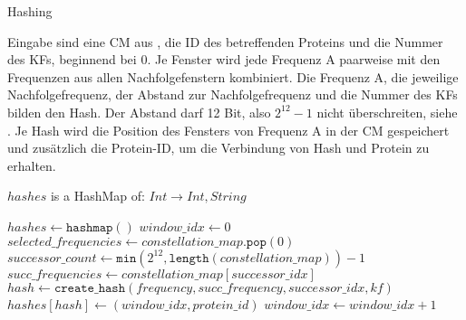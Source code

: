         \begin{algorithm}[H]
            \caption{Hashing}\label{alg:hashing}
            Eingabe sind eine \acl{CM} aus , die ID des betreffenden Proteins und die Nummer des \acl{KF}s, beginnend bei 0. Je Fenster wird jede Frequenz A paarweise mit den Frequenzen aus allen Nachfolgefenstern kombiniert. Die Frequenz A, die jeweilige Nachfolgefrequenz, der Abstand zur Nachfolgefrequenz und die Nummer des \acl{KF}s bilden den Hash. Der Abstand darf 12 Bit, also $2^{12}-1$ nicht überschreiten, siehe . Je Hash wird die Position des Fensters von Frequenz A in der \acl{CM} gespeichert und zusätzlich die Protein-ID, um die Verbindung von Hash und Protein zu erhalten.
            \begin{algorithmic}[1]
                \Ensure $hashes$ is a HashMap of: $Int \rightarrow Int, String$

                \State $hashes \gets \texttt{hashmap}()$
                \State $window\_idx \gets 0$
                \Repeat
                    \State $selected\_frequencies \gets constellation\_map.\texttt{pop}(0)$
                        \State $successor\_count \gets \texttt{min}(2^{12}, \texttt{length}(constellation\_map)) - 1$
                            \State $succ\_frequencies \gets constellation\_map[successor\_idx]$
                                \State $hash \gets \texttt{create\_hash}(frequency, succ\_frequency, successor\_idx, kf)$
                                \State $hashes[hash] \gets (window\_idx, protein\_id)$
                            \EndFor
                        \EndFor
                    \EndFor
                    \State $window\_idx \gets window\_idx + 1$
            \end{algorithmic}
        \end{algorithm}

